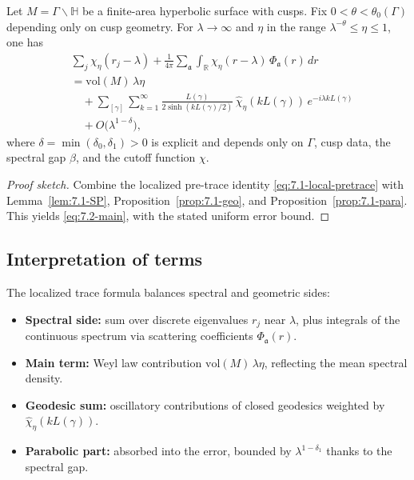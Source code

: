\begin{theorem} \label{thm:main-trace}
Let $M=\Gamma\backslash\mathbb{H}$ be a finite-area hyperbolic surface with cusps. Fix $0<\theta<\theta_0(\Gamma)$ depending only on cusp geometry. For $\lambda\to\infty$ and $\eta$ in the range $\lambda^{-\theta}\le \eta\le 1$, one has
\begin{align}
  &\sum_{j} \chi_\eta(r_j-\lambda)
   + \frac{1}{4\pi}\sum_{\mathfrak{a}}\int_{\mathbb{R}}
       \chi_\eta(r-\lambda)\,\Phi_{\mathfrak{a}}(r)\, dr \nonumber\\
  &= \mathrm{vol}(M)\,\lambda\eta \nonumber\\
  &\quad + \sum_{[\gamma]}\sum_{k=1}^\infty
       \frac{L(\gamma)}{2\sinh(k L(\gamma)/2)}\,
       \widehat{\chi}_\eta(kL(\gamma))\, e^{-i\lambda kL(\gamma)} \label{eq:7.2-main}\\
  &\quad + O\!\big(\lambda^{1-\delta}\big), \nonumber
\end{align}
where $\delta=\min(\delta_0,\delta_1)>0$ is explicit and depends only on $\Gamma$, cusp data, the spectral gap $\beta$, and the cutoff function $\chi$.
\end{theorem}

\begin{proof}[Proof sketch]
Combine the localized pre-trace identity \eqref{eq:7.1-local-pretrace} with Lemma~\ref{lem:7.1-SP}, Proposition~\ref{prop:7.1-geo}, and Proposition~\ref{prop:7.1-para}. This yields \eqref{eq:7.2-main}, with the stated uniform error bound.
\end{proof}

\subsection{Interpretation of terms} \label{subsec:7.2-interpretation}

The localized trace formula balances spectral and geometric sides:
\begin{itemize}
  \item \textbf{Spectral side:} sum over discrete eigenvalues $r_j$ near $\lambda$, plus integrals of the continuous spectrum via scattering coefficients $\Phi_{\mathfrak{a}}(r)$.
  \item \textbf{Main term:} Weyl law contribution $\mathrm{vol}(M)\,\lambda\eta$, reflecting the mean spectral density.
  \item \textbf{Geodesic sum:} oscillatory contributions of closed geodesics weighted by $\widehat{\chi}_\eta(kL(\gamma))$.
  \item \textbf{Parabolic part:} absorbed into the error, bounded by $\lambda^{1-\delta_1}$ thanks to the spectral gap.
\end{itemize}

